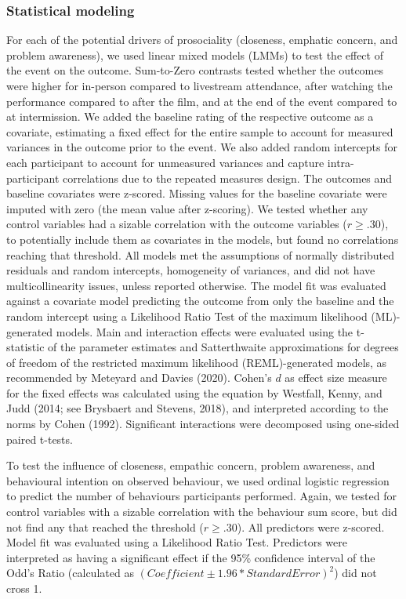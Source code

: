 \documentclass[
  man,floatsintext]{apa6}
\begin{document}
\subsubsection{Statistical modeling}\label{statistical-modeling}

For each of the potential drivers of prosociality (closeness, emphatic concern, and problem awareness), we used linear mixed models (LMMs) to test the effect of the event on the outcome. Sum-to-Zero contrasts tested whether the outcomes were higher for in-person compared to livestream attendance, after watching the performance compared to after the film, and at the end of the event compared to at intermission. We added the baseline rating of the respective outcome as a covariate, estimating a fixed effect for the entire sample to account for measured variances in the outcome prior to the event. We also added random intercepts for each participant to account for unmeasured variances and capture intra-participant correlations due to the repeated measures design. The outcomes and baseline covariates were z-scored. Missing values for the baseline covariate were imputed with zero (the mean value after z-scoring). We tested whether any control variables had a sizable correlation with the outcome variables (\(r \geq .30\)), to potentially include them as covariates in the models, but found no correlations reaching that threshold. All models met the assumptions of normally distributed residuals and random intercepts, homogeneity of variances, and did not have multicollinearity issues, unless reported otherwise. The model fit was evaluated against a covariate model predicting the outcome from only the baseline and the random intercept using a Likelihood Ratio Test of the maximum likelihood (ML)-generated models. Main and interaction effects were evaluated using the t-statistic of the parameter estimates and Satterthwaite approximations for degrees of freedom of the restricted maximum likelihood (REML)-generated models, as recommended by Meteyard and Davies (2020). Cohen's \(d\) as effect size measure for the fixed effects was calculated using the equation by Westfall, Kenny, and Judd (2014; see Brysbaert and Stevens, 2018), and interpreted according to the norms by Cohen (1992). Significant interactions were decomposed using one-sided paired t-tests.

To test the influence of closeness, empathic concern, problem awareness, and behavioural intention on observed behaviour, we used ordinal logistic regression to predict the number of behaviours participants performed. Again, we tested for control variables with a sizable correlation with the behaviour sum score, but did not find any that reached the threshold (\(r \geq .30\)). All predictors were z-scored. Model fit was evaluated using a Likelihood Ratio Test. Predictors were interpreted as having a significant effect if the 95\% confidence interval of the Odd's Ratio (calculated as \((Coefficient \pm 1.96*Standard Error)^2\)) did not cross 1.
\end{document}
